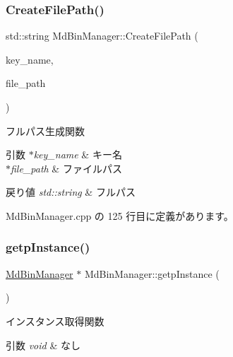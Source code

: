 \subsubsection{\texorpdfstring{Create\+File\+Path()}{CreateFilePath()}}
{\footnotesize\ttfamily std\+::string Md\+Bin\+Manager\+::\+Create\+File\+Path (\begin{DoxyParamCaption}\item[{const std\+::string $\ast$}]{key\+\_\+name,  }\item[{const std\+::string $\ast$}]{file\+\_\+path }\end{DoxyParamCaption})\hspace{0.3cm}{\ttfamily [private]}}



フルパス生成関数 


\begin{DoxyParams}{引数}
{\em $\ast$key\+\_\+name} & キー名 \\
\hline
{\em $\ast$file\+\_\+path} & ファイルパス \\
\hline
\end{DoxyParams}

\begin{DoxyRetVals}{戻り値}
{\em std\+::string} & フルパス \\
\hline
\end{DoxyRetVals}


 Md\+Bin\+Manager.\+cpp の 125 行目に定義があります。

\mbox{\label{class_md_bin_manager_a2e26bac953ea00748662887e58447f02}} 
\subsubsection{\texorpdfstring{getp\+Instance()}{getpInstance()}}
{\footnotesize\ttfamily \mbox{\hyperlink{class_md_bin_manager}{Md\+Bin\+Manager}} $\ast$ Md\+Bin\+Manager\+::getp\+Instance (\begin{DoxyParamCaption}{ }\end{DoxyParamCaption})\hspace{0.3cm}{\ttfamily [static]}}



インスタンス取得関数 


\begin{DoxyParams}{引数}
{\em void} & なし \\
\hline
\end{DoxyParams}

